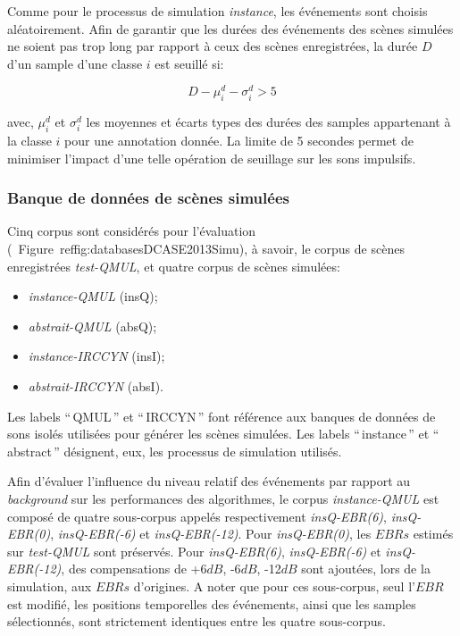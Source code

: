 Comme pour le processus de simulation \emph{instance}, les événements sont choisis aléatoirement. Afin de garantir que les durées des événements des scènes simulées ne soient pas trop long par rapport à ceux des scènes enregistrées, la durée $D$ d'un sample d'une classe $i$ est seuillé si:

\begin{equation}
D-\mu_i^d-\sigma_i^d>5
\end{equation}

avec, $\mu_i^d$ et $\sigma_i^d$ les moyennes et écarts types des durées des samples appartenant à la classe $i$ pour une annotation donnée. La limite de 5 secondes permet de minimiser l'impact d'une telle opération de seuillage sur les sons impulsifs.

\subsubsection{Banque de données de scènes simulées}
\label{sec:ch7_datasetEtEbr}

Cinq corpus sont considérés pour l'évaluation (\cf~Figure~ref{fig:databasesDCASE2013Simu}), à savoir, le corpus de scènes enregistrées \emph{test-QMUL}, et quatre corpus de scènes simulées:

\begin{itemize}
\item \emph{instance-QMUL} (insQ);
\item \emph{abstrait-QMUL} (absQ);
\item \emph{instance-IRCCYN} (insI);
\item \emph{abstrait-IRCCYN} (absI).
\end{itemize}

Les labels ``\,QMUL\,'' et ``\,IRCCYN\,'' font référence aux banques de données de sons isolés utilisées pour générer les scènes simulées. Les labels ``\,instance\,'' et ``\,abstract\,'' désignent, eux, les processus de simulation utilisés. 

Afin d'évaluer l'influence du niveau relatif des événements par rapport au \emph{background} sur les performances des algorithmes, le corpus \emph{instance-QMUL} est composé de quatre sous-corpus appelés respectivement \emph{insQ-EBR(6)}, \emph{insQ-EBR(0)}, \emph{insQ-EBR(-6)} et \emph{insQ-EBR(-12)}. Pour \emph{insQ-EBR(0)}, les $EBRs$ estimés sur \emph{test-QMUL} sont préservés.  Pour \emph{insQ-EBR(6)}, \emph{insQ-EBR(-6)} et \emph{insQ-EBR(-12)}, des compensations de +6$dB$, -6$dB$, -12$dB$ sont ajoutées, lors de la simulation, aux $EBRs$ d'origines. A noter que pour ces sous-corpus, seul l'$EBR$ est modifié, les positions temporelles des événements, ainsi que les samples sélectionnés, sont strictement identiques entre les quatre sous-corpus.

